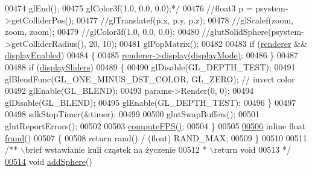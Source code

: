 \begin{DoxyCode}
{{{{{{{00474 \textcolor{comment}{        glEnd();}
00475 \textcolor{comment}{        glColor3f(1.0, 0.0, 0.0);*/}
00476     \textcolor{comment}{//float3 p = psystem->getColliderPos();}
00477     \textcolor{comment}{//glTranslatef(p.x, p.y, p.z);}
00478         \textcolor{comment}{//glScalef(zoom, zoom, zoom);}
00479     \textcolor{comment}{//glColor3f(1.0, 0.0, 0.0);}
00480     \textcolor{comment}{//glutSolidSphere(psystem->getColliderRadius(), 20, 10);}
00481     glPopMatrix();
00482 
00483     \textcolor{keywordflow}{if} (\hyperlink{particles_8cpp_a748beea58f866663fc6894969b21d061}{renderer} && \hyperlink{particles_8cpp_a14095d7bf2ff02e5172105454df40b9a}{displayEnabled})
00484     \{
00485         \hyperlink{particles_8cpp_a748beea58f866663fc6894969b21d061}{renderer}\hyperlink{class_particle_renderer_a80b2f52dc28bb3abbde021f7fe96f8ff}{->}\hyperlink{class_particle_renderer_a80b2f52dc28bb3abbde021f7fe96f8ff}{display}\hyperlink{class_particle_renderer_a80b2f52dc28bb3abbde021f7fe96f8ff}{(}\hyperlink{particles_8cpp_afd1b0caccb0d688ceb91c2547b9da1d9}{displayMode}\hyperlink{class_particle_renderer_a80b2f52dc28bb3abbde021f7fe96f8ff}{)};
00486     \}
00487 
00488     \textcolor{keywordflow}{if} (\hyperlink{particles_8cpp_ac345a677e529047cf89d33fc26f10fe7}{displaySliders})
00489     \{
00490         glDisable(GL\_DEPTH\_TEST);
00491         glBlendFunc(GL\_ONE\_MINUS\_DST\_COLOR, GL\_ZERO); \textcolor{comment}{// invert color}
00492         glEnable(GL\_BLEND);
00493         params->Render(0, 0);
00494         glDisable(GL\_BLEND);
00495         glEnable(GL\_DEPTH\_TEST);
00496     \}
00497 
00498     sdkStopTimer(&timer);
00499 
00500     glutSwapBuffers();
00501     glutReportErrors();
00502 
00503     \hyperlink{particles_8cpp_a6fed970e4454f0b672cd023315b9e343}{computeFPS}\hyperlink{particles_8cpp_a6fed970e4454f0b672cd023315b9e343}{(}\hyperlink{particles_8cpp_a6fed970e4454f0b672cd023315b9e343}{)};
00504 \}
00505 
\hypertarget{particles_8cpp_source_l00506}{}\hyperlink{particles_8cpp_a5459f6b6b39f9a6b80de7f17c3777ee2}{00506} \textcolor{keyword}{inline} \textcolor{keywordtype}{float} \hyperlink{particle_system_8cpp_a5459f6b6b39f9a6b80de7f17c3777ee2}{frand}()
00507 \{
00508     \textcolor{keywordflow}{return} rand() / (\textcolor{keywordtype}{float}) RAND\_MAX;
00509 \}
00510 
00511 \textcolor{comment}{/** \(\backslash\)brief wstawianie kuli cząstek na życzenie}
00512 \textcolor{comment}{ * \(\backslash\)return void}
00513 \textcolor{comment}{ */}
\hypertarget{particles_8cpp_source_l00514}{}\hyperlink{particles_8cpp_a9872049f02ceefff37c3bd4f0f7b1891}{00514} \textcolor{keywordtype}{void} \hyperlink{particles_8cpp_a9872049f02ceefff37c3bd4f0f7b1891}{addSphere}()
}}}}}}}
\end{DoxyCode}
